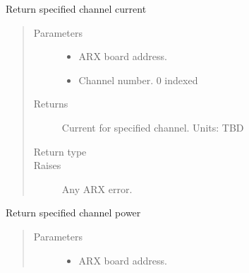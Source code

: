 \documentclass[letterpaper,10pt,english]{sphinxmanual}
\begin{document}
\begin{fulllineitems}
\begin{fulllineitems}
\label{\detokenize{index:lwautils.lwa_arx.ARX.get_chan_current}}
Return specified channel current
\begin{quote}\begin{description}
\item[{Parameters}] \leavevmode\begin{itemize}
\item {} 
 \textendash{} ARX board address.

\item {} 
 \textendash{} Channel number. 0 indexed

\end{itemize}

\item[{Returns}] \leavevmode
Current for specified channel. Units: TBD

\item[{Return type}] \leavevmode
{}

\item[{Raises}] \leavevmode
{} \textendash{} Any ARX error.

\end{description}\end{quote}

\end{fulllineitems}


\begin{fulllineitems}
\label{\detokenize{index:lwautils.lwa_arx.ARX.get_chan_power}}
Return specified channel power
\begin{quote}\begin{description}
\item[{Parameters}] \leavevmode\begin{itemize}
\item {} 
 \textendash{} ARX board address.


\end{itemize}
\end{description}
\end{quote}
\end{fulllineitems}
\end{fulllineitems}
\end{document}
